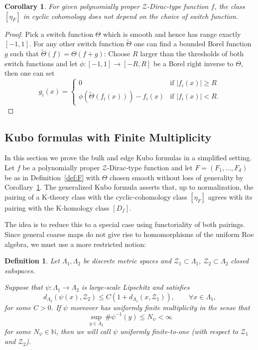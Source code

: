 \documentclass[12pt]{amsart}
\newtheorem{definition}[theorem]{Definition}
\newtheorem{corollary}[theorem]{Corollary}
\newcommand{\Zz}{{\mathcal Z}}
\begin{document}
\begin{corollary}
\label{cor:F_independence}
For given polynomially proper $\Zz$-Dirac-type function $f$, the class $[\eta_F]$ in cyclic cohomology does not depend on the choice of switch function.
\end{corollary}
\begin{proof}
Pick a switch function $\Theta$ which is smooth and hence has range exactly $[-1,1]$. For any other switch function $\tilde{\Theta}$ one can find a bounded Borel function $g$ such that $\tilde{\Theta}(f)=\Theta(f+g)$: Choose $R$ larger than the thresholds of both switch functions and let $\phi:[-1,1]\to [-R,R]$ be a Borel right inverse to $\Theta$, then one can set $$g_i(x)=\begin{cases}
    0 & \text{if }|f_i(x)|\geq R\\
    \phi(\tilde{\Theta}(f_i(x)))-f_i(x) & \text{if }|f_i(x)|< R.
\end{cases}$$
\end{proof}




\subsection{Kubo formulas with Finite Multiplicity}\label{sec:kubo_uf}

In this section we prove the bulk and edge Kubo formulas in a simplified setting. Let $f$ be a polynomially proper $\Zz$-Dirac-type function and let $F=(F_1,\ldots,F_d)$ be as in Definition~\ref{def:F} with $\Theta$
chosen smooth without loss of generality by Corollary~\ref{cor:F_independence}. 
The generalized Kubo formula asserts that, up to normalization, the pairing of a K-theory class with the cyclic-cohomology class $[\eta_F]$ agrees with its pairing with the K-homology class $[D_f]$.

The idea is to reduce this to a special case using functoriality of both pairings. Since general coarse maps do not give rise to homomorphisms of the uniform Roe algebra, we must use a more restricted notion:
\begin{definition}
Let $\Lambda_1,\Lambda_2$ be discrete metric spaces and $\Zz_1\subset \Lambda_1$, $\Zz_2\subset \Lambda_2$ closed subspaces. 

Suppose that $\psi: \Lambda_1\to \Lambda_2$ is large-scale Lipschitz and satisfies
\begin{equation}
\label{eq:boundary_distance}
d_{\Lambda_2}(\psi(x),\Zz_2)\leq C (1+d_{\Lambda_1}(x,\Zz_1)), \qquad \forall x\in \Lambda_1,
\end{equation}
for some $C>0$. If $\psi$ moreover has uniformly finite multiplicity in the sense that 
\[\sup_{y \in \Lambda_2} \# \psi^{-1}(y) \leq N_{\psi} < \infty\]
for some $N_\psi\in\mathbb N$, then we will call $\psi$ uniformly finite-to-one (with respect to $\Zz_1$ and $\Zz_2$).
\end{definition}
\end{document}
